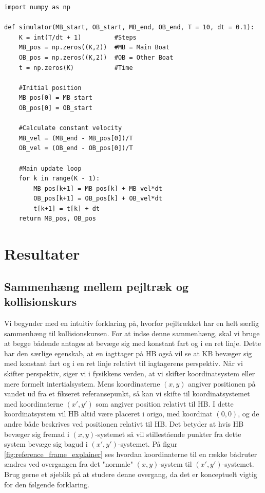 \documentclass[%
 reprint,
nofootinbib,
aps,
]{revtex4-1}
\begin{document}
\begin{verbatim}
import numpy as np

def simulator(MB_start, OB_start, MB_end, OB_end, T = 10, dt = 0.1):
    K = int(T/dt + 1)         #Steps
    MB_pos = np.zeros((K,2))  #MB = Main Boat
    OB_pos = np.zeros((K,2))  #OB = Other Boat
    t = np.zeros(K)           #Time

    #Initial position
    MB_pos[0] = MB_start
    OB_pos[0] = OB_start

    #Calculate constant velocity
    MB_vel = (MB_end - MB_pos[0])/T
    OB_vel = (OB_end - OB_pos[0])/T

    #Main update loop
    for k in range(K - 1):
        MB_pos[k+1] = MB_pos[k] + MB_vel*dt
        OB_pos[k+1] = OB_pos[k] + OB_vel*dt
        t[k+1] = t[k] + dt
    return MB_pos, OB_pos
\end{verbatim}


\section{Resultater}
\subsection{Sammenhæng mellem pejltræk og kollisionskurs}
Vi begynder med en intuitiv forklaring på, hvorfor pejltrækket har en helt særlig sammenhæng til kollisionskursen. For at indse denne sammenhæng, skal vi bruge at begge bådende antages at bevæge sig med konstant fart og i en ret linje. Dette har den særlige egenskab, at en iagttager på HB også vil se at KB bevæger sig med konstant fart og i en ret linje relativt til iagtagerens perspektiv. Når vi skifter perspektiv, siger vi i fysikkens verden, at vi skifter koordinatsystem eller mere formelt intertialsystem. Mens koordinaterne $(x, y)$ angiver positionen på vandet ud fra et fikseret referansepunkt, så kan vi skifte til koordinatsystemet med koordinaterne $(x',y')$ som angiver position relativt til HB. I dette koordinatsystem vil HB altid være placeret i origo, med koordinat $(0,0)$, og de andre både beskrives ved positionen relativt til HB. Det betyder at hvis HB bevæger sig fremad i $(x,y)$-systemet så vil stillestående punkter fra dette system bevæge sig bagud i $(x',y')$-systemet. På figur \ref{fig:reference_frame_explainer} ses hvordan koordinaterne til en række bådruter ændres ved overgangen fra det "normale" $(x,y)$-system til $(x',y')$-systemet. Brug gerne et øjeblik på at studere denne overgang, da det er konceptuelt vigtig for den følgende forklaring.
\end{document}
